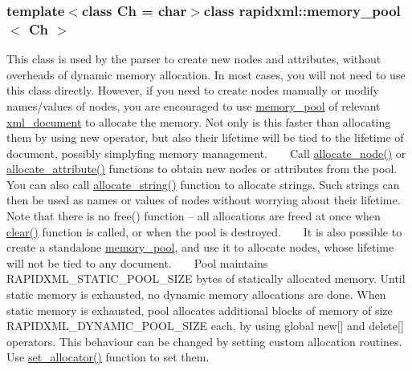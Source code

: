 \subsubsection*{template$<$class Ch = char$>$class rapidxml\+::memory\+\_\+pool$<$ Ch $>$}

This class is used by the parser to create new nodes and attributes, without overheads of dynamic memory allocation. In most cases, you will not need to use this class directly. However, if you need to create nodes manually or modify names/values of nodes, you are encouraged to use \hyperlink{classrapidxml_1_1memory__pool}{memory\+\_\+pool} of relevant \hyperlink{singletonrapidxml_1_1xml__document}{xml\+\_\+document} to allocate the memory. Not only is this faster than allocating them by using {\ttfamily new} operator, but also their lifetime will be tied to the lifetime of document, possibly simplyfing memory management. ~\newline
~\newline
 Call \hyperlink{classrapidxml_1_1memory__pool_a4118581c29ee9a2f6b55ebf7dac185f8}{allocate\+\_\+node()} or \hyperlink{classrapidxml_1_1memory__pool_a3de2a66c983336e006ea3844e244ed30}{allocate\+\_\+attribute()} functions to obtain new nodes or attributes from the pool. You can also call \hyperlink{classrapidxml_1_1memory__pool_a171941b39d55b868358da97462185f58}{allocate\+\_\+string()} function to allocate strings. Such strings can then be used as names or values of nodes without worrying about their lifetime. Note that there is no {\ttfamily free()} function -- all allocations are freed at once when \hyperlink{classrapidxml_1_1memory__pool_aad377c835fdaed1cb2cc9df194cf84e4}{clear()} function is called, or when the pool is destroyed. ~\newline
~\newline
 It is also possible to create a standalone \hyperlink{classrapidxml_1_1memory__pool}{memory\+\_\+pool}, and use it to allocate nodes, whose lifetime will not be tied to any document. ~\newline
~\newline
 Pool maintains {\ttfamily R\+A\+P\+I\+D\+X\+M\+L\+\_\+\+S\+T\+A\+T\+I\+C\+\_\+\+P\+O\+O\+L\+\_\+\+S\+I\+Z\+E} bytes of statically allocated memory. Until static memory is exhausted, no dynamic memory allocations are done. When static memory is exhausted, pool allocates additional blocks of memory of size {\ttfamily R\+A\+P\+I\+D\+X\+M\+L\+\_\+\+D\+Y\+N\+A\+M\+I\+C\+\_\+\+P\+O\+O\+L\+\_\+\+S\+I\+Z\+E} each, by using global {\ttfamily new\mbox{[}\mbox{]}} and {\ttfamily delete\mbox{[}\mbox{]}} operators. This behaviour can be changed by setting custom allocation routines. Use \hyperlink{classrapidxml_1_1memory__pool_a84d3d8d2cdfc00501e1dcf26d889ae03}{set\+\_\+allocator()} function to set them. ~\newline
